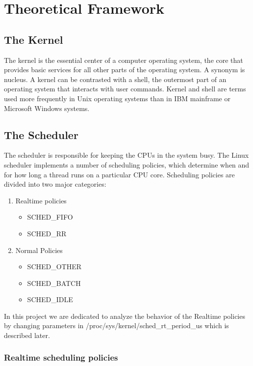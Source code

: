 \documentclass[a4paper]{article}
\begin{document}
\section{Theoretical Framework}

\subsection{The Kernel}
The kernel is the essential center of a computer operating system, the core that provides basic services for all other parts of the operating system. A synonym is nucleus. A kernel can be contrasted with a shell, the outermost part of an operating system that interacts with user commands. Kernel and shell are terms used more frequently in Unix operating systems than in IBM mainframe or Microsoft Windows systems.

\subsection{The Scheduler}
The scheduler is responsible for keeping the CPUs in the system busy. The Linux scheduler implements a number of scheduling policies, which determine when and for how long a thread runs on a particular CPU core.
Scheduling policies are divided into two major categories:

\begin{enumerate}

\item Realtime policies
\begin{itemize}
\item SCHED\_FIFO
\item SCHED\_RR
\end{itemize}
\item Normal Policies
\begin{itemize}
\item SCHED\_OTHER
\item SCHED\_BATCH
\item SCHED\_IDLE
\end{itemize}

\end{enumerate}

In this project we are dedicated to analyze the behavior of the Realtime policies by changing parameters in /proc/sys/kernel/sched\_rt\_period\_us which is described later.

\subsubsection{Realtime scheduling policies}
\end{document}
